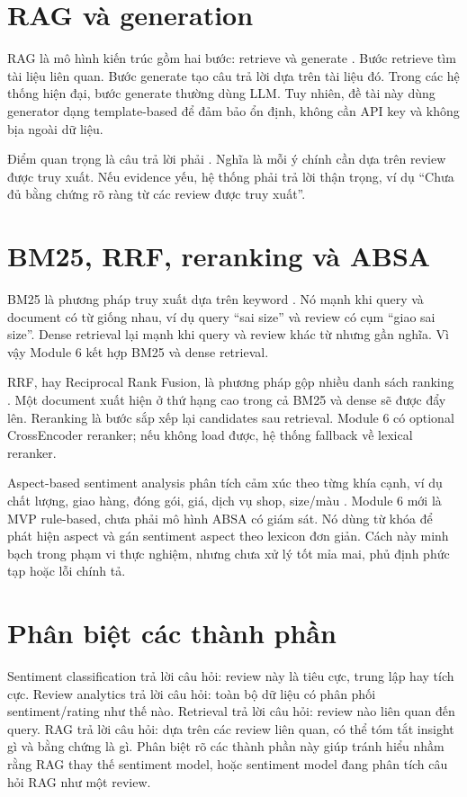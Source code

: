 \section{RAG và \EvidenceGrounded{} generation}
RAG là mô hình kiến trúc gồm hai bước: retrieve và generate \cite{lewis2020rag}. Bước retrieve tìm tài liệu liên quan. Bước generate tạo câu trả lời dựa trên tài liệu đó. Trong các hệ thống hiện đại, bước generate thường dùng LLM. Tuy nhiên, đề tài này dùng generator dạng template-based để đảm bảo ổn định, không cần API key và không bịa ngoài dữ liệu.

Điểm quan trọng là câu trả lời phải \EvidenceGrounded{}. Nghĩa là mỗi ý chính cần dựa trên review được truy xuất. Nếu evidence yếu, hệ thống phải trả lời thận trọng, ví dụ “Chưa đủ bằng chứng rõ ràng từ các review được truy xuất”.

\section{BM25, RRF, reranking và ABSA}
BM25 là phương pháp truy xuất dựa trên keyword \cite{robertson2009probabilistic}. Nó mạnh khi query và document có từ giống nhau, ví dụ query “sai size” và review có cụm “giao sai size”. Dense retrieval lại mạnh khi query và review khác từ nhưng gần nghĩa. Vì vậy Module 6 kết hợp BM25 và dense retrieval.

RRF, hay Reciprocal Rank Fusion, là phương pháp gộp nhiều danh sách ranking \cite{cormack2009rrf}. Một document xuất hiện ở thứ hạng cao trong cả BM25 và dense sẽ được đẩy lên. Reranking là bước sắp xếp lại candidates sau retrieval. Module 6 có optional CrossEncoder reranker; nếu không load được, hệ thống fallback về lexical reranker.

Aspect-based sentiment analysis phân tích cảm xúc theo từng khía cạnh, ví dụ chất lượng, giao hàng, đóng gói, giá, dịch vụ shop, size/màu \cite{pontiki2014semeval}. Module 6 mới là MVP rule-based, chưa phải mô hình ABSA có giám sát. Nó dùng từ khóa để phát hiện aspect và gán sentiment aspect theo lexicon đơn giản. Cách này minh bạch trong phạm vi thực nghiệm, nhưng chưa xử lý tốt mỉa mai, phủ định phức tạp hoặc lỗi chính tả.

\section{Phân biệt các thành phần}
Sentiment classification trả lời câu hỏi: review này là tiêu cực, trung lập hay tích cực. Review analytics trả lời câu hỏi: toàn bộ dữ liệu có phân phối sentiment/rating như thế nào. Retrieval trả lời câu hỏi: review nào liên quan đến query. RAG trả lời câu hỏi: dựa trên các review liên quan, có thể tóm tắt insight gì và bằng chứng là gì. Phân biệt rõ các thành phần này giúp tránh hiểu nhầm rằng RAG thay thế sentiment model, hoặc sentiment model đang phân tích câu hỏi RAG như một review.

